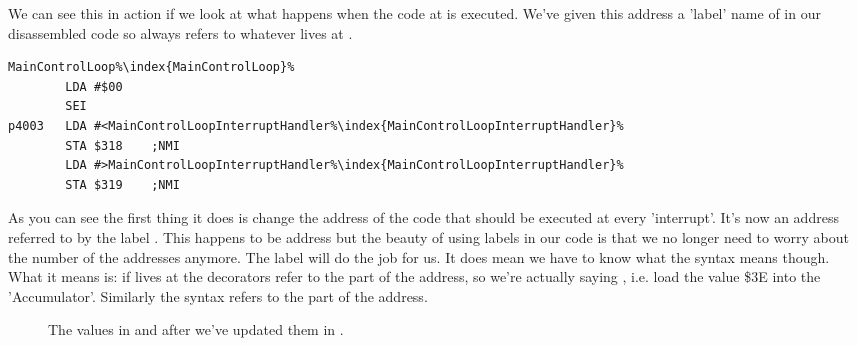 We can see this in action if we look at what happens when the code at  is executed. We've given this address 
a 'label' name of  in our disassembled code so  always refers to whatever lives at
. 

\begin{lstlisting}[caption=The code at \icode{\$4000}. ,escapechar=\%]
MainControlLoop%\index{MainControlLoop}%
        LDA #$00
        SEI
p4003   LDA #<MainControlLoopInterruptHandler%\index{MainControlLoopInterruptHandler}%
        STA $318    ;NMI
        LDA #>MainControlLoopInterruptHandler%\index{MainControlLoopInterruptHandler}%
        STA $319    ;NMI
\end{lstlisting}

As you can see the first thing it does is change the address of the code that should be executed at every 'interrupt'. It's now an
address referred to by the label . This happens to be address  but the beauty
of using labels in our code is that we no longer need to worry about the number of the addresses anymore. The label will do the job
for us. It does mean we have to know what the syntax  means though. What it means is:
if  lives at  the \icode{\#<} decorators refer to the  part of the
address, so we're actually saying , i.e. load the value \$3E into the 'Accumulator'. Similarly the syntax
 refers to the  part of the address.

\begin{figure}[H]
  {
    \setlength{\tabcolsep}{3.0pt}
    \setlength\cmidrulewidth{\heavyrulewidth} %
    \begin{adjustbox}{width=7cm,center}
    \end{adjustbox}
  }\caption{The values in  and  after we've updated them in .}
\end{figure}

